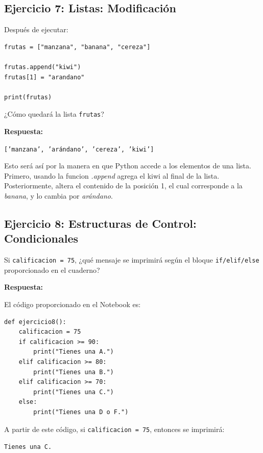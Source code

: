\documentclass[12pt]{article}
\newcommand{\respuesta}{
    \vspace{0.3cm}
    \noindent\textbf{Respuesta:}
    \vspace{0.2cm}
}
\begin{document}
\subsection*{Ejercicio 7: Listas: Modificación}

Después de ejecutar:

\begin{lstlisting}
frutas = ["manzana", "banana", "cereza"]

frutas.append("kiwi")
frutas[1] = "arandano"

print(frutas)
\end{lstlisting}

¿Cómo quedará la lista \texttt{frutas}?

\respuesta
\begin{center}
\texttt{['manzana', 'arándano', 'cereza', 'kiwi']}
\end{center}

Esto será así por la manera en que Python accede a los elementos de una lista. Primero, usando la funcion \textit{.append} agrega el kiwi al final de la lista. Posteriormente, altera el contenido de la posición 1, el cual corresponde a la \textit{banana}, y lo cambia por \textit{arándano}. 

\subsection*{Ejercicio 8: Estructuras de Control: Condicionales}

Si \texttt{calificacion = 75}, ¿qué mensaje se imprimirá según el bloque \texttt{if/elif/else} proporcionado en el cuaderno?

\respuesta

El código proporcionado en el Notebook es:
\begin{lstlisting}
def ejercicio8():
    calificacion = 75
    if calificacion >= 90:
        print("Tienes una A.")
    elif calificacion >= 80:
        print("Tienes una B.")
    elif calificacion >= 70:
        print("Tienes una C.")
    else:
        print("Tienes una D o F.") 
\end{lstlisting}

A partir de este código, si \texttt{calificacion = 75}, entonces se imprimirá:

\begin{center}
\texttt{Tienes una C.}
\end{center}
\end{document}
